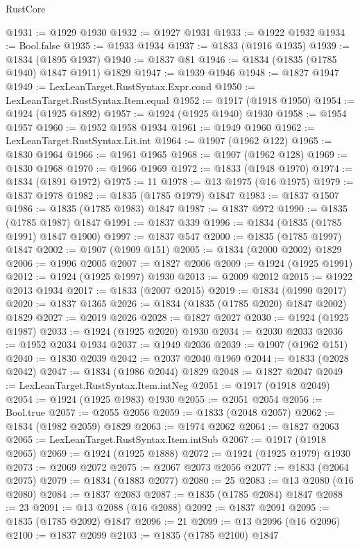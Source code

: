 \begin{lexlean}{RustCore}
\begin{coremodule}
@1931 := @1929 @1930
@1932 := @1927 @1931
@1933 := @1922 @1932
@1934 := Bool.false
@1935 := @1933 @1934
@1937 := @1833 (@1916 @1935)
@1939 := @1834 (@1895 @1937)
@1940 := @1837 @81
@1946 := @1834 (@1835 (@1785 @1940) @1847 @1911) @1829
@1947 := @1939 @1946
@1948 := @1827 @1947
@1949 := LexLeanTarget.RustSyntax.Expr.cond
@1950 := LexLeanTarget.RustSyntax.Item.equal
@1952 := @1917 (@1918 @1950)
@1954 := @1924 (@1925 @1892)
@1957 := @1924 (@1925 @1940) @1930
@1958 := @1954 @1957
@1960 := @1952 @1958 @1934
@1961 := @1949 @1960
@1962 := LexLeanTarget.RustSyntax.Lit.int
@1964 := @1907 (@1962 @122)
@1965 := @1830 @1964
@1966 := @1961 @1965
@1968 := @1907 (@1962 @128)
@1969 := @1830 @1968
@1970 := @1966 @1969
@1972 := @1833 (@1948 @1970)
@1974 := @1834 (@1891 @1972)
@1975 := 11
@1978 := @13 @1975 (@16 @1975)
@1979 := @1837 @1978
@1982 := @1835 (@1785 @1979) @1847
@1983 := @1837 @1507
@1986 := @1835 (@1785 @1983) @1847
@1987 := @1837 @972
@1990 := @1835 (@1785 @1987) @1847
@1991 := @1837 @339
@1996 := @1834 (@1835 (@1785 @1991) @1847 @1900)
@1997 := @1837 @547
@2000 := @1835 (@1785 @1997) @1847
@2002 := @1907 (@1909 @151)
@2005 := @1834 (@2000 @2002) @1829
@2006 := @1996 @2005
@2007 := @1827 @2006
@2009 := @1924 (@1925 @1991)
@2012 := @1924 (@1925 @1997) @1930
@2013 := @2009 @2012
@2015 := @1922 @2013 @1934
@2017 := @1833 (@2007 @2015)
@2019 := @1834 (@1990 @2017)
@2020 := @1837 @1365
@2026 := @1834 (@1835 (@1785 @2020) @1847 @2002) @1829
@2027 := @2019 @2026
@2028 := @1827 @2027
@2030 := @1924 (@1925 @1987)
@2033 := @1924 (@1925 @2020) @1930
@2034 := @2030 @2033
@2036 := @1952 @2034 @1934
@2037 := @1949 @2036
@2039 := @1907 (@1962 @151)
@2040 := @1830 @2039
@2042 := @2037 @2040 @1969
@2044 := @1833 (@2028 @2042)
@2047 := @1834 (@1986 @2044) @1829
@2048 := @1827 @2047
@2049 := LexLeanTarget.RustSyntax.Item.intNeg
@2051 := @1917 (@1918 @2049)
@2054 := @1924 (@1925 @1983) @1930
@2055 := @2051 @2054
@2056 := Bool.true
@2057 := @2055 @2056
@2059 := @1833 (@2048 @2057)
@2062 := @1834 (@1982 @2059) @1829
@2063 := @1974 @2062
@2064 := @1827 @2063
@2065 := LexLeanTarget.RustSyntax.Item.intSub
@2067 := @1917 (@1918 @2065)
@2069 := @1924 (@1925 @1888)
@2072 := @1924 (@1925 @1979) @1930
@2073 := @2069 @2072
@2075 := @2067 @2073 @2056
@2077 := @1833 (@2064 @2075)
@2079 := @1834 (@1883 @2077)
@2080 := 25
@2083 := @13 @2080 (@16 @2080)
@2084 := @1837 @2083
@2087 := @1835 (@1785 @2084) @1847
@2088 := 23
@2091 := @13 @2088 (@16 @2088)
@2092 := @1837 @2091
@2095 := @1835 (@1785 @2092) @1847
@2096 := 21
@2099 := @13 @2096 (@16 @2096)
@2100 := @1837 @2099
@2103 := @1835 (@1785 @2100) @1847

\end{coremodule}
\end{lexlean}
